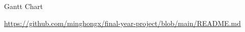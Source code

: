 \begin{frame}{Gantt Chart}

\url{https://github.com/minghongx/final-year-project/blob/main/README.md}

\end{frame}
